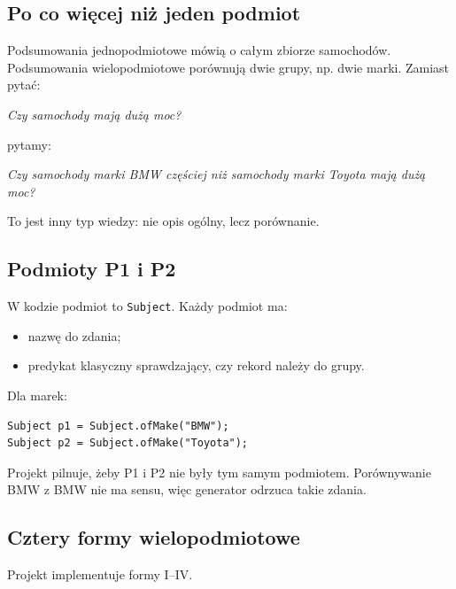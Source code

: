 \documentclass[11pt,a4paper]{article}
\newcommand{\code}[1]{\texttt{#1}}
\begin{document}
\subsection{Po co więcej niż jeden podmiot}

Podsumowania jednopodmiotowe mówią o całym zbiorze samochodów. Podsumowania wielopodmiotowe porównują dwie grupy, np. dwie marki. Zamiast pytać:

\begin{center}
\emph{Czy samochody mają dużą moc?}
\end{center}

pytamy:

\begin{center}
\emph{Czy samochody marki BMW częściej niż samochody marki Toyota mają dużą moc?}
\end{center}

To jest inny typ wiedzy: nie opis ogólny, lecz porównanie.

\subsection{Podmioty P1 i P2}

W kodzie podmiot to \code{Subject}. Każdy podmiot ma:

\begin{itemize}
    \item nazwę do zdania;
    \item predykat klasyczny sprawdzający, czy rekord należy do grupy.
\end{itemize}

Dla marek:

\begin{lstlisting}[style=javacode]
Subject p1 = Subject.ofMake("BMW");
Subject p2 = Subject.ofMake("Toyota");
\end{lstlisting}

Projekt pilnuje, żeby P1 i P2 nie były tym samym podmiotem. Porównywanie BMW z BMW nie ma sensu, więc generator odrzuca takie zdania.

\subsection{Cztery formy wielopodmiotowe}

Projekt implementuje formy I--IV.
\end{document}
